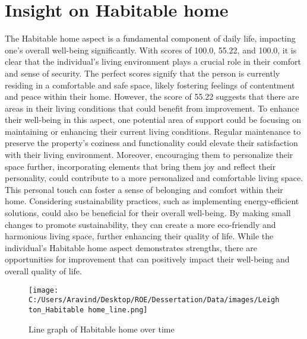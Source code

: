 \documentclass[10pt, a4paper]{article}%
\begin{document}
\section{Insight on Habitable home}%
\label{sec:InsightonHabitablehome}%
The Habitable home aspect is a fundamental component of daily life, impacting one's overall well{-}being significantly. With scores of 100.0, 55.22, and 100.0, it is clear that the individual's living environment plays a crucial role in their comfort and sense of security. \newline%
\newline%
The perfect scores signify that the person is currently residing in a comfortable and safe space, likely fostering feelings of contentment and peace within their home. However, the score of 55.22 suggests that there are areas in their living conditions that could benefit from improvement.\newline%
\newline%
To enhance their well{-}being in this aspect, one potential area of support could be focusing on maintaining or enhancing their current living conditions. Regular maintenance to preserve the property's coziness and functionality could elevate their satisfaction with their living environment.\newline%
\newline%
Moreover, encouraging them to personalize their space further, incorporating elements that bring them joy and reflect their personality, could contribute to a more personalized and comfortable living space. This personal touch can foster a sense of belonging and comfort within their home.\newline%
\newline%
Considering sustainability practices, such as implementing energy{-}efficient solutions, could also be beneficial for their overall well{-}being. By making small changes to promote sustainability, they can create a more eco{-}friendly and harmonious living space, further enhancing their quality of life.\newline%
\newline%
While the individual's Habitable home aspect demonstrates strengths, there are opportunities for improvement that can positively impact their well{-}being and overall quality of life.%


\begin{figure}[H]%
\centering%
\texttt{[image: C:/Users/Aravind/Desktop/ROE/Dessertation/Data/images/Leighton\_Habitable home\_line.png]}%
\caption{Line graph of Habitable home over time}%
\end{figure}
\end{document}
